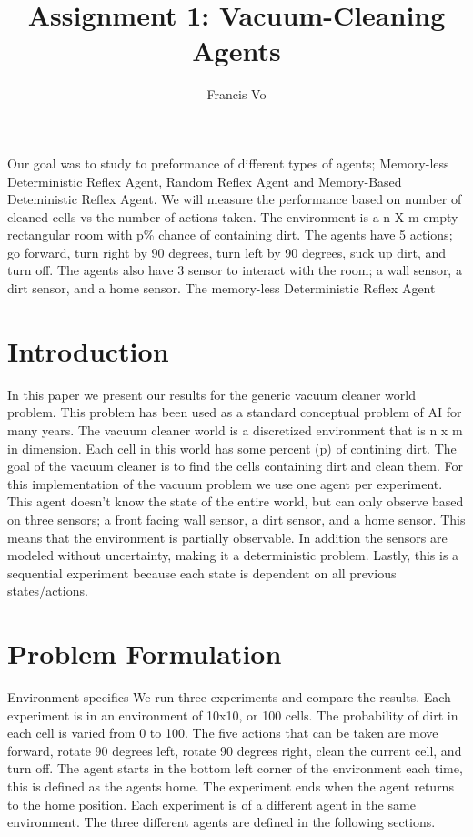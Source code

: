 \documentclass[a4paper,10pt]{article}
\title{Assignment 1: Vacuum-Cleaning Agents}
\author{Francis Vo}
\begin{document}
\maketitle
Our goal was to study to preformance of different types of agents; Memory-less Deterministic Reflex Agent, Random Reflex Agent and Memory-Based Deteministic Reflex Agent.
We will measure the performance based on number of cleaned cells vs the number of actions taken.
The environment is a n X m empty rectangular room with p\% chance of containing dirt.
The agents have 5 actions; go forward, turn right by 90 degrees, turn left by 90 degrees, suck up dirt, and turn off.
The agents also have 3 sensor to interact with the room; a wall sensor, a dirt sensor, and a home sensor.
The memory-less Deterministic Reflex Agent

\section{Introduction}

In this paper we present our results for the generic vacuum cleaner world problem.
This problem has been used as a standard conceptual problem of AI for many years.
The vacuum cleaner world is a discretized environment that is n x m in dimension.
Each cell in this world has some percent (p) of contining dirt.
The goal of the vacuum cleaner is to find the cells containing dirt and clean them.
For this implementation of the vacuum problem we use one agent per experiment.
This agent doesn't know the state of the entire world, but can only observe based on three sensors; a front facing wall sensor, a dirt sensor, and a home sensor.
This means that the environment is partially observable.
In addition the sensors are modeled without uncertainty, making it a deterministic problem.
Lastly, this is a sequential experiment because each state is dependent on all previous states/actions.





\section{Problem Formulation}
Environment specifics
We run three experiments and compare the results.
Each experiment is in an environment of 10x10, or 100 cells.
The probability of dirt in each cell is varied from 0 to 100.
The five actions that can be taken are move forward, rotate 90 degrees left, rotate 90 degrees right, clean the current cell, and turn off.
The agent starts in the bottom left corner of the environment each time, this is defined as the agents home.
The experiment ends when the agent returns to the home position.
Each experiment is of a different agent in the same environment.
The three different agents are defined in the following sections.
\end{document}
